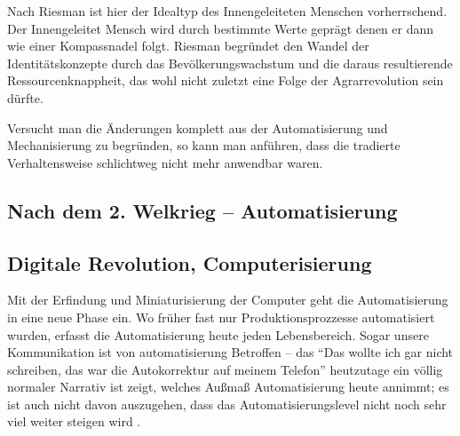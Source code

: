 Nach Riesman ist hier der Idealtyp des Innengeleiteten Menschen vorherrschend. Der Innengeleitet Mensch wird durch bestimmte Werte geprägt denen er dann wie einer Kompassnadel folgt.
Riesman begründet den Wandel der Identitätskonzepte durch das Bevölkerungswachstum und die daraus resultierende Ressourcenknappheit, das wohl nicht zuletzt eine Folge der Agrarrevolution sein dürfte.

Versucht man die Änderungen komplett aus der Automatisierung und Mechanisierung zu begründen, so kann man anführen, dass die tradierte Verhaltensweise schlichtweg nicht mehr anwendbar waren. 



\subsection{Nach dem 2. Welkrieg – Automatisierung}

\subsection {Digitale Revolution, Computerisierung}
Mit der Erfindung und Miniaturisierung der Computer geht die Automatisierung in eine neue Phase ein. Wo früher fast nur Produktionsprozzesse automatisiert wurden, erfasst die Automatisierung heute jeden Lebensbereich.
Sogar unsere Kommunikation ist von automatisierung Betroffen – das \enquote{Das wollte ich gar nicht schreiben, das war die Autokorrektur auf meinem Telefon} heutzutage ein völlig normaler Narrativ ist zeigt, welches Außmaß Automatisierung heute annimmt; es ist auch nicht davon auszugehen, dass das Automatisierungslevel nicht noch sehr viel weiter steigen wird \parencite{arbeitsfrei}.

